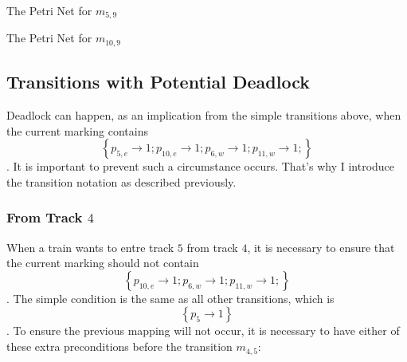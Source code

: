 \documentclass[12pt]{article}
\begin{document}
The Petri Net for $m_{5,9}$


The Petri Net for $m_{10,9}$


\subsection{Transitions with Potential Deadlock}

Deadlock can happen, as an implication from the simple transitions above, when the current marking contains $$\left\{p_{5,e} \rightarrow 1; p_{10,e} \rightarrow 1; p_{6,w} \rightarrow 1; p_{11,w} \rightarrow 1; \right\}$$. It is important to prevent such a circumstance occurs. That's why I introduce the transition notation as described previously.

\subsubsection{From Track $4$}

When a train wants to entre track $5$ from track $4$, it is necessary to ensure that the current marking should not contain $$\left\{p_{10,e} \rightarrow 1; p_{6,w} \rightarrow 1; p_{11,w} \rightarrow 1; \right\}$$. The simple condition is the same as all other transitions, which is $$\left\{p_5 \rightarrow 1\right\}$$. To ensure the previous mapping will not occur, it is necessary to have either of these extra preconditions before the transition $m_{4,5}$:
\end{document}
